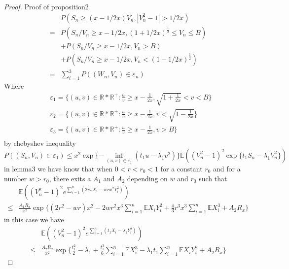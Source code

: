 \documentclass[bj,authoryear]{imsart}
\numberwithin{equation}{section}
\theoremstyle{plain}
\theoremstyle{definition}
\begin{document}
\begin{proof} Proof of proposition2
  \begin{equation}
    \begin{aligned}
      &P(S_n\geq (x-1/2x)V_n,|V_{n}^{2}-1|>1/2x)\\
      =&P(S_n/V_n\geq x-1/2x,(1+1/2x)^{\frac{1}{2}}\leq V_n\leq B)\\
      &+P(S_n/V_n\geq x-1/2x,V_n>B)\\
      &+P(S_n/V_n\geq x-1/2x,V_n<(1-1/2x)^{\frac{1}{2}})\\
      =&\sum_{i=1}^{3}P((W_n,V_n)\in\varepsilon_n)
    \end{aligned}
  \end{equation}
  Where
  \begin{equation}
    \begin{aligned}
      &\varepsilon_1 = \{(u,v)\in\mathbb{R}*\mathbb{R^+}:\frac{u}{v}\geq x-\frac{1}{2x},\sqrt{1+\frac{1}{2x}}<v<B \}\\
      &\varepsilon_2 = \{(u,v)\in\mathbb{R}*\mathbb{R^+}:\frac{u}{v}\geq x-\frac{1}{2x},v<\sqrt{1-\frac{1}{2x}} \}\\
      &\varepsilon_3 = \{(u,v)\in\mathbb{R}*\mathbb{R^+}:\frac{u}{v}\geq x-\frac{1}{2x},v>B \}\\
    \end{aligned}
  \end{equation}
  by chebyshev inequality
  $$P((S_n,V_n)\in\varepsilon_1)\leq x^2\exp\{-\inf_{(u,v)\in\varepsilon_1}(t_1u-\lambda_1v^2)\}\mathbb{E}((V_n^2-1)^2\exp\{t_1S_n-\lambda_1V_n^2\})$$
  in lemma3 we have know that
  when $0<r<r_0<1$ for a constant $r_0$ and for a number $w>r_0$, there exits a $A_1$ and $A_2$ depending on $w$ and $r_0$ such that
  \begin{equation}
    \begin{aligned}
      &\mathbb{E}\left((V_n^2-1)^2e^{\sum_{i=1}^{n}(2rxX_i-wrx^2Y_i^2)}\right)\\
      \leq& \frac{A_1R_x}{x^2}\exp\{(2r^2-wr)x^2-2wr^2x^3\sum_{i=1}^{n}\mathbb{E} X_iY_i^2+\frac{4}{3}r^3x^3\sum_{i=1}^{n}\mathbb{E} X_i^3+A_2R_x\}
    \end{aligned}
  \end{equation}
  in this case we have
  \begin{equation}
    \begin{aligned}
      &\mathbb{E} \left((V_n^2-1)^2e^{\sum_{i=1}^{n}(t_1X_i-\lambda_1Y_i^2)}\right)\\
      \leq & \frac{A_2R_x}{x^2}\exp\{\frac{t_1^2}{2}-\lambda_1+\frac{t_1^3}{6}\sum_{i=1}^{n}\mathbb{E} X_i^3-\lambda_1t_1\sum_{i=1}^{n}\mathbb{E} X_iY_i^2+A_2R_x\}

\end{aligned}
\end{equation}
\end{proof}
\end{document}

